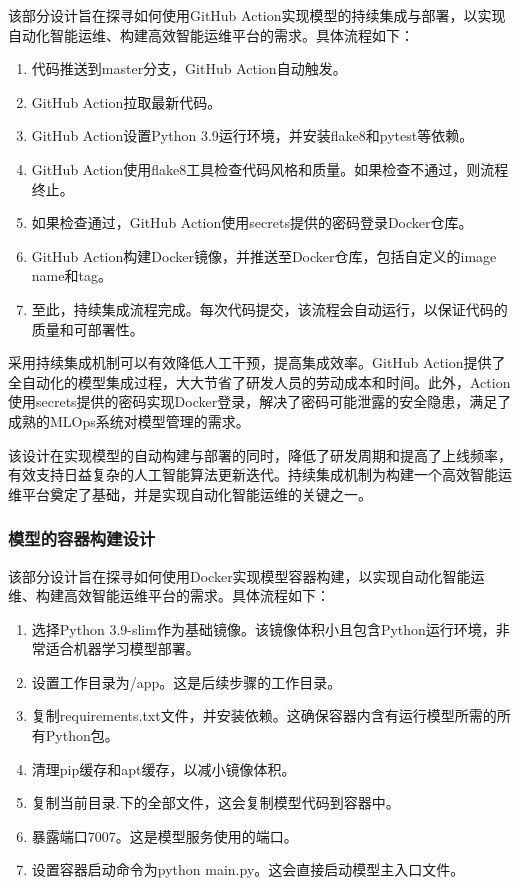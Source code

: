 \documentclass{HDU-Bachelor-Thesis}
\begin{document}
该部分设计旨在探寻如何使用GitHub Action实现模型的持续集成与部署，以实现自动化智能运维、构建高效智能运维平台的需求。具体流程如下：

\begin{enumerate}   
    \item 代码推送到master分支，GitHub Action自动触发。
    \item GitHub Action拉取最新代码。 
    \item GitHub Action设置Python 3.9运行环境，并安装flake8和pytest等依赖。
    \item GitHub Action使用flake8工具检查代码风格和质量。如果检查不通过，则流程终止。
    \item 如果检查通过，GitHub Action使用secrets提供的密码登录Docker仓库。
    \item GitHub Action构建Docker镜像，并推送至Docker仓库，包括自定义的image name和tag。
    \item 至此，持续集成流程完成。每次代码提交，该流程会自动运行，以保证代码的质量和可部署性。
\end{enumerate}

采用持续集成机制可以有效降低人工干预，提高集成效率。GitHub Action提供了全自动化的模型集成过程，大大节省了研发人员的劳动成本和时间。此外，Action使用secrets提供的密码实现Docker登录，解决了密码可能泄露的安全隐患，满足了成熟的MLOps系统对模型管理的需求。

该设计在实现模型的自动构建与部署的同时，降低了研发周期和提高了上线频率，有效支持日益复杂的人工智能算法更新迭代。持续集成机制为构建一个高效智能运维平台奠定了基础，并是实现自动化智能运维的关键之一。

\subsubsection{模型的容器构建设计}

该部分设计旨在探寻如何使用Docker实现模型容器构建，以实现自动化智能运维、构建高效智能运维平台的需求。具体流程如下：

\begin{enumerate}   
    \item 选择Python 3.9-slim作为基础镜像。该镜像体积小且包含Python运行环境，非常适合机器学习模型部署。  
    \item 设置工作目录为/app。这是后续步骤的工作目录。
    \item 复制requirements.txt文件，并安装依赖。这确保容器内含有运行模型所需的所有Python包。
    \item 清理pip缓存和apt缓存，以减小镜像体积。
    \item 复制当前目录.下的全部文件，这会复制模型代码到容器中。 
    \item 暴露端口7007。这是模型服务使用的端口。
    \item 设置容器启动命令为python main.py。这会直接启动模型主入口文件。
\end{enumerate}
\end{document}
